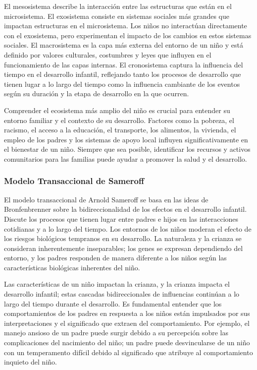 \documentclass[11pt,letterpaper]{report}
\begin{document}
El mesosistema describe la interacción entre las estructuras que están en el
microsistema. El exosistema consiste en sistemas sociales más grandes que
impactan estructuras en el microsistema. Los niños no interactúan directamente
con el exosistema, pero experimentan el impacto de los cambios en estos sistemas
sociales. El macrosistema es la capa más externa del entorno de un niño y está
definido por valores culturales, costumbres y leyes que influyen en el
funcionamiento de las capas internas. El cronosistema captura la influencia del
tiempo en el desarrollo infantil, reflejando tanto los procesos de desarrollo
que tienen lugar a lo largo del tiempo como la influencia cambiante de los
eventos según su duración y la etapa de desarrollo en la que ocurren.
\cite{Feldman3}

Comprender el ecosistema más amplio del niño es crucial para entender su 
entorno familiar y el contexto de su desarrollo. Factores como la pobreza, el 
racismo, el acceso a la educación, el transporte, los alimentos, la vivienda,
el empleo de los padres y los sistemas de apoyo local influyen
significativamente en el bienestar de un niño. Siempre que sea posible, 
identificar los recursos y activos comunitarios para las familias puede ayudar 
a promover la salud y el desarrollo. \cite{Nelson19}

\subsubsection{Modelo Transaccional de Sameroff}
El modelo transaccional de Arnold Sameroff se basa en las ideas de
Bronfenbrenner sobre la bidireccionalidad de los efectos en el desarrollo
infantil. Discute los procesos que tienen lugar entre padres e hijos en las
interacciones cotidianas y a lo largo del tiempo. Los entornos de los niños
moderan el efecto de los riesgos biológicos tempranos en su desarrollo. La
naturaleza y la crianza se consideran inherentemente inseparables; los genes se
expresan dependiendo del entorno, y los padres responden de manera diferente a
los niños según las características biológicas inherentes del niño.
\cite{Feldman3}

Las características de un niño impactan la crianza, y la crianza impacta el
desarrollo infantil; estas cascadas bidireccionales de influencias continúan a
lo largo del tiempo durante el desarrollo. Es fundamental entender que los
comportamientos de los padres en respuesta a los niños están impulsados por
sus interpretaciones y el significado que extraen del comportamiento. Por
ejemplo, el manejo ansioso de un padre puede surgir debido a su percepción
sobre las complicaciones del nacimiento del niño; un padre puede desvincularse
de un niño con un temperamento difícil debido al significado que atribuye al
comportamiento inquieto del niño. \cite{Sameroff2009}
\end{document}

